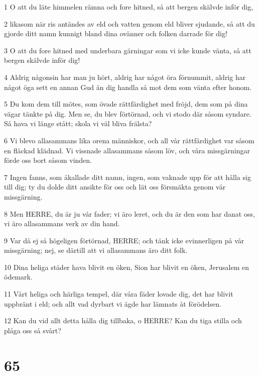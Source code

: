 \par 1 O att du läte himmelen rämna och fore hitned, så att bergen skälvde inför dig,
\par 2 likasom när ris antändes av eld och vatten genom eld bliver sjudande, så att du gjorde ditt namn kunnigt bland dina ovänner och folken darrade för dig!
\par 3 O att du fore hitned med underbara gärningar som vi icke kunde vänta, så att bergen skälvde inför dig!
\par 4 Aldrig någonsin har man ju hört, aldrig har något öra förnummit, aldrig har något öga sett en annan Gud än dig handla så mot dem som vänta efter honom.
\par 5 Du kom dem till mötes, som övade rättfärdighet med fröjd, dem som på dina vägar tänkte på dig. Men se, du blev förtörnad, och vi stodo där såsom syndare. Så hava vi länge stått; skola vi väl bliva frälsta?
\par 6 Vi blevo allasammans lika orena människor, och all vår rättfärdighet var såsom en fläckad klädnad. Vi vissnade allasammans såsom löv, och våra missgärningar förde oss bort såsom vinden.
\par 7 Ingen fanns, som åkallade ditt namn, ingen, som vaknade upp för att hålla sig till dig; ty du dolde ditt ansikte för oss och lät oss försmäkta genom vår missgärning.
\par 8 Men HERRE, du är ju vår fader; vi äro leret, och du är den som har danat oss, vi äro allasammans verk av din hand.
\par 9 Var då ej så högeligen förtörnad, HERRE; och tänk icke evinnerligen på vår missgärning; nej, se därtill att vi allasammans äro ditt folk.
\par 10 Dina heliga städer hava blivit en öken, Sion har blivit en öken, Jerusalem en ödemark.
\par 11 Vårt heliga och härliga tempel, där våra fäder lovade dig, det har blivit uppbränt i eld; och allt vad dyrbart vi ägde har lämnats åt förödelsen.
\par 12 Kan du vid allt detta hålla dig tillbaka, o HERRE? Kan du tiga stilla och plåga oss så svårt?

\chapter{65}

